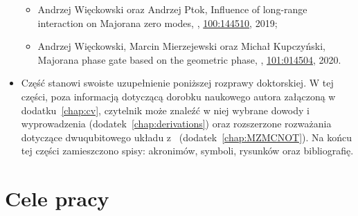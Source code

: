 \begin{itemize}
\begin{itemize}
        \item[\cite{wieckowski.ptok.2019}] Andrzej Więckowski oraz Andrzej Ptok,   Influence of long-range interaction on Majorana zero modes, \href{http://dx.doi.org/10.1103/PhysRevB.100.144510}{}, \href{http://dx.doi.org/10.1103/PhysRevB.100.144510}{100:144510}, 2019;
        
        
        \item[\cite{wieckowski.mierzejewski.2020}] Andrzej Więckowski, Marcin Mierzejewski oraz Michał Kupczyński,
        Majorana phase gate based on the geometric phase,
        \href{http://dx.doi.org/10.1103/PhysRevB.101.014504}{},
        \href{http://dx.doi.org/10.1103/PhysRevB.101.014504}{101:014504}, 2020.
        
    \end{itemize}
    
    
    \item Część \hyperref[part:IV]{} stanowi swoiste uzupełnienie poniższej rozprawy doktorskiej.
W tej części, poza informacją dotyczącą dorobku naukowego autora załączoną w dodatku~\ref{chap:cv}, czytelnik może znaleźć w niej wybrane dowody i wyprowadzenia (dodatek~\ref{chap:derivations}) oraz rozszerzone rozważania dotyczące dwuqubitowego układu z \MZM\ (dodatek~\ref{chap:MZMCNOT}).
Na końcu tej części zamieszczono spisy: akronimów, symboli, rysunków oraz bibliografię.
    
    
\end{itemize}




\ornament


\section*{Cele pracy}

